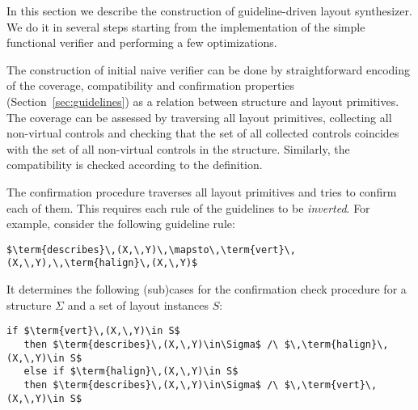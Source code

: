 
In this section we describe the construction of guideline-driven layout synthesizer. We do it in several steps starting
from the implementation of the simple functional verifier and performing a few optimizations.

The construction of initial naive verifier can be done
by straightforward encoding of the coverage, compatibility and confirmation properties (Section~\ref{sec:guidelines}) as a relation between structure and layout primitives.
The coverage can be assessed by traversing all layout primitives, collecting all non-virtual controls and
checking that the set of all collected controls coincides with the set of all non-virtual controls in the structure.
Similarly, the compatibility is checked according to the definition.

The confirmation procedure traverses all layout primitives and tries to confirm each of them. This requires each
rule of the guidelines to be \emph{inverted}. For example, consider the following guideline rule:

\begin{lstlisting}[language=ocanren,basicstyle=\small]
   $\term{describes}\,(X,\,Y)\,\mapsto\,\term{vert}\,(X,\,Y),\,\term{halign}\,(X,\,Y)$
\end{lstlisting}

\noindent It determines the following (sub)cases for the confirmation check procedure for a structure $\Sigma$ and
a set of layout instances $S$:

\begin{lstlisting}[language=ocanren,basicstyle=\small]
   if $\term{vert}\,(X,\,Y)\in S$
   then $\term{describes}\,(X,\,Y)\in\Sigma$ /\ $\,\term{halign}\,(X,\,Y)\in S$
   else if $\term{halign}\,(X,\,Y)\in S$
   then $\term{describes}\,(X,\,Y)\in\Sigma$ /\ $\,\term{vert}\,(X,\,Y)\in S$
\end{lstlisting}

